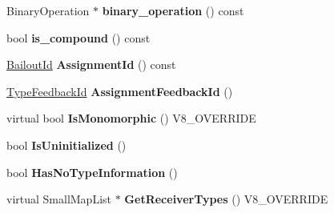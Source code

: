 \begin{DoxyCompactItemize}
\item 
\hypertarget{classv8_1_1internal_1_1_v8___f_i_n_a_l_a993bceae99f73b724cbd65ef29c2dcbd}{}Binary\+Operation $\ast$ {\bfseries binary\+\_\+operation} () const \label{classv8_1_1internal_1_1_v8___f_i_n_a_l_a993bceae99f73b724cbd65ef29c2dcbd}

\item 
\hypertarget{classv8_1_1internal_1_1_v8___f_i_n_a_l_a899db47f38bf6c22d606ef986e89ef60}{}bool {\bfseries is\+\_\+compound} () const \label{classv8_1_1internal_1_1_v8___f_i_n_a_l_a899db47f38bf6c22d606ef986e89ef60}

\item 
\hypertarget{classv8_1_1internal_1_1_v8___f_i_n_a_l_a7dcaac465fea05a2016fbe314eb3a8e7}{}\hyperlink{classv8_1_1internal_1_1_bailout_id}{Bailout\+Id} {\bfseries Assignment\+Id} () const \label{classv8_1_1internal_1_1_v8___f_i_n_a_l_a7dcaac465fea05a2016fbe314eb3a8e7}

\item 
\hypertarget{classv8_1_1internal_1_1_v8___f_i_n_a_l_a4ae9bafc55e5ab3450d4dec64c45dba6}{}\hyperlink{classv8_1_1internal_1_1_type_feedback_id}{Type\+Feedback\+Id} {\bfseries Assignment\+Feedback\+Id} ()\label{classv8_1_1internal_1_1_v8___f_i_n_a_l_a4ae9bafc55e5ab3450d4dec64c45dba6}

\item 
\hypertarget{classv8_1_1internal_1_1_v8___f_i_n_a_l_ab3b27577f5e222d5cf5e659ec2135e23}{}virtual bool {\bfseries Is\+Monomorphic} () V8\+\_\+\+O\+V\+E\+R\+R\+I\+D\+E\label{classv8_1_1internal_1_1_v8___f_i_n_a_l_ab3b27577f5e222d5cf5e659ec2135e23}

\item 
\hypertarget{classv8_1_1internal_1_1_v8___f_i_n_a_l_a37c6f100560570f47e4e173744b7ed1e}{}bool {\bfseries Is\+Uninitialized} ()\label{classv8_1_1internal_1_1_v8___f_i_n_a_l_a37c6f100560570f47e4e173744b7ed1e}

\item 
\hypertarget{classv8_1_1internal_1_1_v8___f_i_n_a_l_a4c6ab6d1b6b96f49f1eddc8941f55b79}{}bool {\bfseries Has\+No\+Type\+Information} ()\label{classv8_1_1internal_1_1_v8___f_i_n_a_l_a4c6ab6d1b6b96f49f1eddc8941f55b79}

\item 
\hypertarget{classv8_1_1internal_1_1_v8___f_i_n_a_l_add3b27d1df1c5e153be402bd03ccffdb}{}virtual Small\+Map\+List $\ast$ {\bfseries Get\+Receiver\+Types} () V8\+\_\+\+O\+V\+E\+R\+R\+I\+D\+E\label{classv8_1_1internal_1_1_v8___f_i_n_a_l_add3b27d1df1c5e153be402bd03ccffdb}


\end{DoxyCompactItemize}
